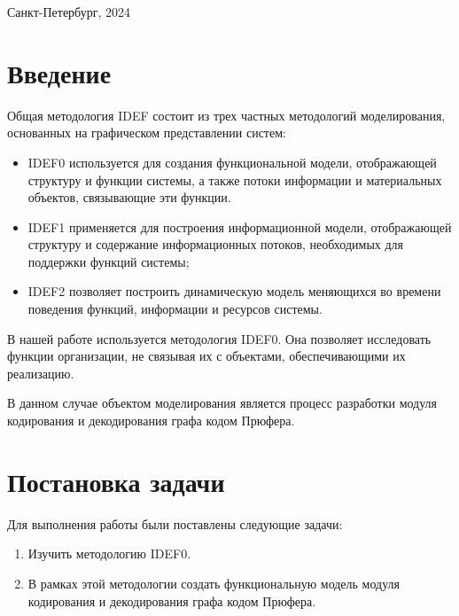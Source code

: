 \documentclass[a4paper, final]{article}
\begin{document}
\hfill \break
\hfill \break
\begin{center} \small{Санкт-Петербург, 2024} \end{center}
\thispagestyle{empty} %

\newpage

\tableofcontents

\newpage

\cleardoublepage
{}
{}
\section*{Введение}
Общая методология IDEF состоит из трех частных
методологий моделирования, основанных на графическом представлении
систем:
\begin{itemize}
  \item IDEF0 используется для создания функциональной модели, отображающей
  структуру и функции системы, а также потоки информации и материальных 
  объектов, связывающие эти функции.
  \item IDEF1 применяется для построения информационной модели, отображающей
  структуру и содержание информационных потоков, необходимых для 
  поддержки функций системы;
  \item IDEF2 позволяет построить динамическую модель меняющихся во времени
  поведения функций, информации и ресурсов системы.
\end{itemize}

В нашей работе используется методология IDEF0. Она позволяет исследовать функции организации, не связывая их с объектами, обеспечивающими их реализацию.

В данном случае объектом моделирования является процесс разработки модуля кодирования и декодирования графа 
кодом Прюфера.

\newpage
\section{Постановка задачи}
\noindent Для выполнения работы были поставлены следующие задачи:
\begin{enumerate}
	\item Изучить методологию IDEF0.
	\item В рамках этой методологии создать функциональную модель модуля кодирования и декодирования графа кодом Прюфера.
\end{enumerate}
\end{document}
